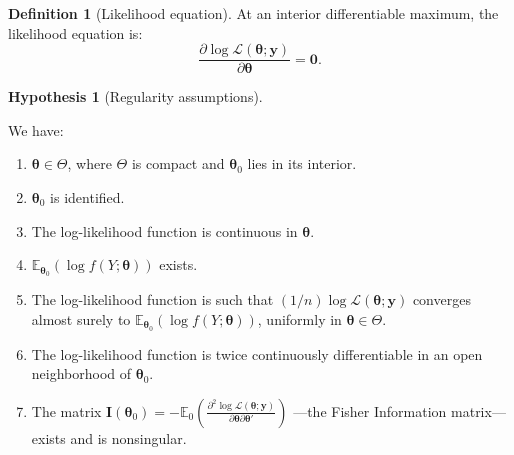 \documentclass[
  11pt,
]{book}
\providecommand{\tightlist}{%
  \setlength{\itemsep}{0pt}\setlength{\parskip}{0pt}}
\theoremstyle{definition}
\newtheorem{definition}{Definition}[chapter]
\theoremstyle{definition}
\theoremstyle{definition}
\theoremstyle{definition}
\newtheorem{hypothesis}{Hypothesis}[chapter]
\theoremstyle{remark}
\begin{document}
\begin{definition}[Likelihood equation]
\protect\hypertarget{def:likFunction}{}\label{def:likFunction}At an interior differentiable maximum, the likelihood equation is:
\begin{equation}
\dfrac{\partial \log \mathcal{L}(\boldsymbol\theta;\mathbf{y})}{\partial \boldsymbol\theta} = \mathbf{0}.
\end{equation}
\end{definition}

\begin{hypothesis}[Regularity assumptions]
\protect\hypertarget{hyp:MLEregularity}{}\label{hyp:MLEregularity}

We have:

\begin{enumerate}
\def\labelenumi{\roman{enumi}.}
\tightlist
\item
  \(\boldsymbol\theta \in \Theta\), where \(\Theta\) is compact and \(\boldsymbol\theta_0\) lies in its interior.
\item
  \(\boldsymbol\theta_0\) is identified.
\item
  The log-likelihood function is continuous in \(\boldsymbol\theta\).
\item
  \(\mathbb{E}_{\boldsymbol\theta_0}(\log f(Y;\boldsymbol\theta))\) exists.
\item
  The log-likelihood function is such that \((1/n)\log\mathcal{L}(\boldsymbol\theta;\mathbf{y})\) converges almost surely to \(\mathbb{E}_{\boldsymbol\theta_0}(\log f(Y;\boldsymbol\theta))\), uniformly in \(\boldsymbol\theta \in \Theta\).
\item
  The log-likelihood function is twice continuously differentiable in an open neighborhood of \(\boldsymbol\theta_0\).
\item
  The matrix \(\mathbf{I}(\boldsymbol\theta_0) = - \mathbb{E}_0 \left( \frac{\partial^2 \log \mathcal{L}(\boldsymbol\theta;\mathbf{y})}{\partial \boldsymbol\theta \partial \boldsymbol\theta'}\right)\) ---the Fisher Information matrix--- exists and is nonsingular.
\end{enumerate}

\end{hypothesis}
\end{document}
